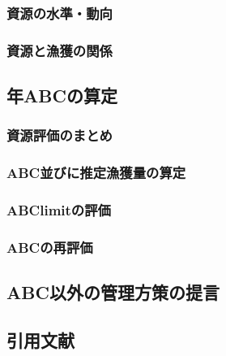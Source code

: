 \subsubsection{資源の水準・動向}
\subsubsection{資源と漁獲の関係}

\subsection{\thisyrad 年ABCの算定}
\subsubsection{資源評価のまとめ}
\subsubsection{ABC並びに推定漁獲量の算定}
\subsubsection{ABClimitの評価}
\subsubsection{ABCの再評価}

\subsection{ABC以外の管理方策の提言}
\subsection{引用文献}
\clearpage

\setcounter{chapter}{0}
